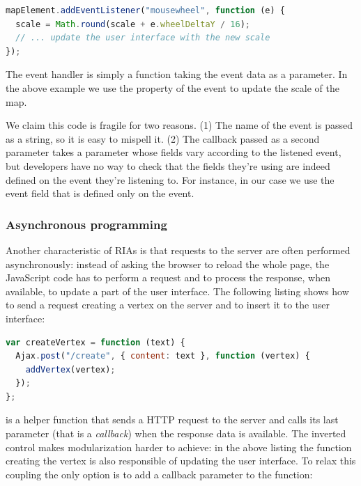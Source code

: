 \documentclass[american,english,runningheads]{llncs}
\begin{document}
\begin{lstlisting}[language=JavaScript,label=event-js,caption=Native JavaScript API to handle events]
mapElement.addEventListener("mousewheel", function (e) {
  scale = Math.round(scale + e.wheelDeltaY / 16);
  // ... update the user interface with the new scale
});
\end{lstlisting}

The event handler is simply a function taking the event data as a parameter. In the above example we use the
 property of the event to update the scale of the map.

We claim this code is fragile for two reasons. (1) The name of the event is passed as a string, so it is easy to
mispell it. (2) The callback passed as a second parameter takes a parameter  whose fields vary according to
the listened event, but developers have no way to check that the fields they’re using are indeed defined on the event
they’re listening to. For instance, in our case we use the  event field that is defined only on the
 event.

\subsubsection{Asynchronous programming}

Another characteristic of RIAs is that requests to the server are often performed asynchronously: instead of asking
the browser to reload the whole page, the JavaScript code has to perform a request and to process the response, when
available, to update a part of the user interface. The following listing shows how to send a request creating a
vertex on the server and to insert it to the user interface:

\begin{lstlisting}[language=JavaScript]
var createVertex = function (text) {
  Ajax.post("/create", { content: text }, function (vertex) {
    addVertex(vertex);
  });
};
\end{lstlisting}

 is a helper function that sends a HTTP request to the server and calls its last parameter
(that is a \emph{callback}) when the response data is available. The inverted control makes modularization harder to
achieve: in the above listing the function creating the vertex is also responsible of updating the user interface.
To relax this coupling the only option is to add a callback parameter to the  function:
\end{document}

